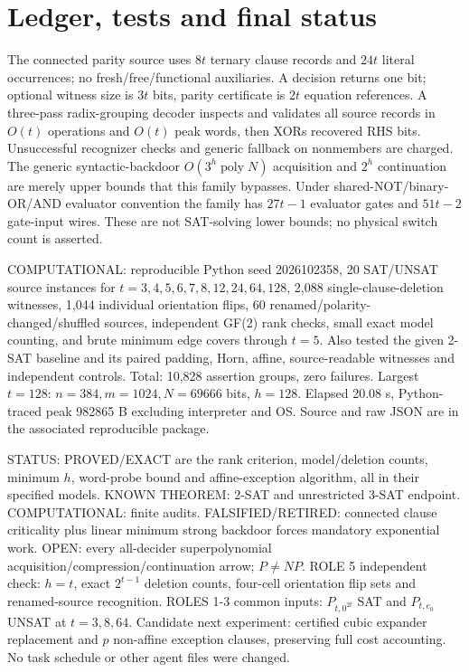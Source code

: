 \documentclass[11pt]{article}
\begin{document}
\section{Ledger, tests and final status}
The connected parity source uses $8t$ ternary clause records and $24t$ literal occurrences; no fresh/free/functional auxiliaries. A decision returns one bit; optional witness size is $3t$ bits, parity certificate is $2t$ equation references. A three-pass radix-grouping decoder inspects and validates all source records in $O(t)$ operations and $O(t)$ peak words, then XORs recovered RHS bits. Unsuccessful recognizer checks and generic fallback on nonmembers are charged. The generic syntactic-backdoor $O(3^h\operatorname{poly}N)$ acquisition and $2^h$ continuation are merely upper bounds that this family bypasses. Under shared-NOT/binary-OR/AND evaluator convention the family has $27t-1$ evaluator gates and $51t-2$ gate-input wires. These are not SAT-solving lower bounds; no physical switch count is asserted.

COMPUTATIONAL: reproducible Python seed 2026102358, 20 SAT/UNSAT source instances for $t=3,4,5,6,7,8,12,24,64,128$, 2,088 single-clause-deletion witnesses, 1,044 individual orientation flips, 60 renamed/polarity-changed/shuffled sources, independent GF(2) rank checks, small exact model counting, and brute minimum edge covers through $t=5$. Also tested the given 2-SAT baseline and its paired padding, Horn, affine, source-readable witnesses and independent controls. Total: 10,828 assertion groups, zero failures. Largest $t=128$: $n=384,m=1024,N=69666$ bits, $h=128$. Elapsed 20.08 s, Python-traced peak 982865 B excluding interpreter and OS. Source and raw JSON are in the associated reproducible package.

STATUS: PROVED/EXACT are the rank criterion, model/deletion counts, minimum $h$, word-probe bound and affine-exception algorithm, all in their specified models. KNOWN THEOREM: 2-SAT and unrestricted 3-SAT endpoint. COMPUTATIONAL: finite audits. FALSIFIED/RETIRED: connected clause criticality plus linear minimum strong backdoor forces mandatory exponential work. OPEN: every all-decider superpolynomial acquisition/compression/continuation arrow; $P\ne NP$.
ROLE 5 independent check: $h=t$, exact $2^{t-1}$ deletion counts, four-cell orientation flip sets and renamed-source recognition. ROLES 1-3 common inputs: $P_{t,0^{2t}}$ SAT and $P_{t,e_0}$ UNSAT at $t=3,8,64$. Candidate next experiment: certified cubic expander replacement and $p$ non-affine exception clauses, preserving full cost accounting. No task schedule or other agent files were changed.
\end{document}
